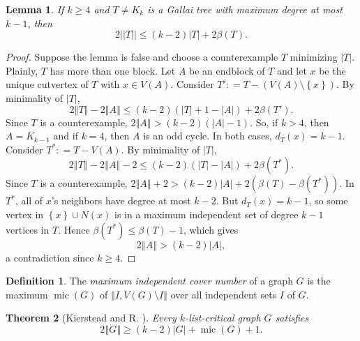 \documentclass[12pt]{article}
\theoremstyle{plain}
\newtheorem{thm}{Theorem}
\newtheorem{lem}[thm]{Lemma}
\theoremstyle{definition}
\newtheorem{defn}{Definition}
\theoremstyle{remark}
\newcommand{\set}[1]{\left\{ #1 \right\}}
\newcommand{\card}[1]{\left|#1\right|}
\newcommand{\size}[1]{\left\Vert#1\right\Vert}
\newcommand{\DefinedAs}{\mathrel{\mathop:}=}
\newcommand{\mic}{\operatorname{mic}}
\begin{document}
\begin{lem}\label{SimpleGallaiBetaBound}
	If $k \ge 4$ and $T \ne K_k$ is a Gallai tree with maximum degree at most $k-1$, then
	\[2||T|| \le (k-2)|T| + 2\beta(T).\]
\end{lem}
\begin{proof}
	Suppose the lemma is false and choose a counterexample $T$ minimizing $\card{T}$.  Plainly, $T$ has more than one block.  Let $A$ be an endblock of $T$ and let $x$ be the unique cutvertex of $T$ with $x \in V(A)$.
	Consider $T' \DefinedAs T - (V(A)\setminus\set{x})$.  By minimality of $\card{T}$,
	\begin{equation*}
		2\size{T} - 2\size{A} \le (k-2)(\card{T} + 1 - \card{A}) + 2\beta(T').
	\end{equation*}
		Since $T$ is a counterexample, $2\size{A} > (k-2)(\card{A} - 1)$.  So, if $k > 4$, then $A = K_{k-1}$ and if $k=4$, then $A$ is an odd cycle.  In both cases, $d_T(x) = k-1$.
	Consider $T^* \DefinedAs T - V(A)$.  By minimality of $\card{T}$,
	\begin{equation*}
	2\size{T} - 2\size{A} - 2 \le (k-2)(\card{T} - \card{A}) + 2\beta(T^*).
	\end{equation*}
	Since $T$ is a counterexample, $2\size{A} + 2 > (k-2)\card{A} + 2(\beta(T) - \beta(T^*))$.  In $T^*$, all of $x$'s neighbors have degree at most $k-2$.
	But $d_T(x) = k-1$, so some vertex in $\set{x} \cup N(x)$ is in a maximum independent set of degree $k-1$ vertices in $T$.  Hence $\beta(T^*) \le \beta(T) - 1$, which gives
	\begin{equation*}
	 2\size{A} > (k-2)\card{A},
	\end{equation*}
	a contradiction since $k \ge 4$.
\end{proof}

\begin{defn} The \emph{maximum independent cover number }of a graph $G$
	is the maximum $\mic(G)$ of $\size{I, V(G) \setminus I}$ over all independent sets $I$
	of $G$. 
\end{defn}

\begin{thm}[Kierstead and R. \cite{KernelMagic}]\label{ConsantListMicStrength} 
	Every $k$-list-critical graph $G$ satisfies
	\[2\size{G} \ge (k-2)\card{G} + \mic(G) + 1.\]
\end{thm}
\end{document}
